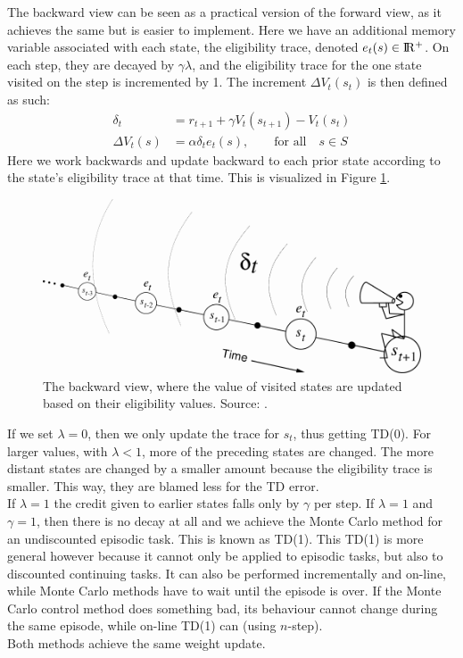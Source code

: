 \documentclass[a4paper]{article}
\begin{document}
The backward view can be seen as a practical version of the forward view, as it achieves the same but is easier to implement.
Here we have an additional memory variable associated with each state, the eligibility trace, denoted $e_t(s) \in \rm I\!R^+$. On each step, they are decayed by $\gamma \lambda$, and the eligibility trace for the one state visited on the step is incremented by 1. The increment $\Delta V_t(s_t)$ is then defined as such:
\begin{subequations}
\label{eq:backview}
\begin{align}
\delta_t &= r_{t+1} + \gamma V_t(s_{t+1}) - V_t(s_t) \label{eq:backview1} \\
\Delta V_t(s) &= \alpha \delta_t e_t(s), \qquad \text{for all} \quad s \in S \label{eq:backview2}
\end{align}
\end{subequations}
Here we work backwards and update backward to each prior state according to the state's eligibility trace at that time. This is visualized in Figure \ref{fig:TDBackwardView}.
\begin{figure}[H]
\includegraphics[width=\linewidth]{images/TDBackwardView.png}
\caption{The backward view, where the value of visited states are updated based on their eligibility values. Source: \cite{Sutton1998ReinforcementIntroductionb}.}
\label{fig:TDBackwardView}
\end{figure}
If we set $\lambda = 0$, then we only update the trace for $s_t$, thus getting TD(0). For larger values, with $\lambda < 1$, more of the preceding states are changed. The more distant states are changed by a smaller amount because the eligibility trace is smaller. This way, they are blamed less for the TD error.\\
If $\lambda = 1$ the credit given to earlier states falls only by $\gamma$ per step. If $\lambda = 1$ and $\gamma = 1$, then there is no decay at all and we achieve the Monte Carlo method for an undiscounted episodic task. This is known as TD(1). This TD(1) is more general however because it cannot only be applied to episodic tasks, but also to discounted continuing tasks. It can also be performed incrementally and on-line, while Monte Carlo methods have to wait until the episode is over. If the Monte Carlo control method does something bad, its behaviour cannot change during the same episode, while on-line TD(1) can (using $n$-step).\\
Both methods achieve the same weight update.\\
\end{document}
